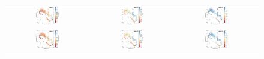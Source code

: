\documentclass{aa}
\begin{document}
\begin{appendix}
\begin{figure}[htbp]
    \centering
    \begin{tabular}{ccc}
        \includegraphics[width=0.3\textwidth]{Plots/tsne_params/tsne_R4_Teff_GES.pdf} & \includegraphics[width=0.3\textwidth]{Plots/tsne_params/tsne_R4_logg_GES.pdf} & \includegraphics[width=0.3\textwidth]{Plots/tsne_params/tsne_R4_FeH_GES.pdf} \\
        \includegraphics[width=0.3\textwidth]{Plots/tsne_params/tsne_R4_Teff_GaiaXGBoost.pdf} & \includegraphics[width=0.3\textwidth]{Plots/tsne_params/tsne_R4_logg_GaiaXGBoost.pdf} & \includegraphics[width=0.3\textwidth]{Plots/tsne_params/tsne_R4_FeH_GaiaXGBoost.pdf} \\

\end{tabular}
\end{figure}
\end{appendix}
\end{document}
